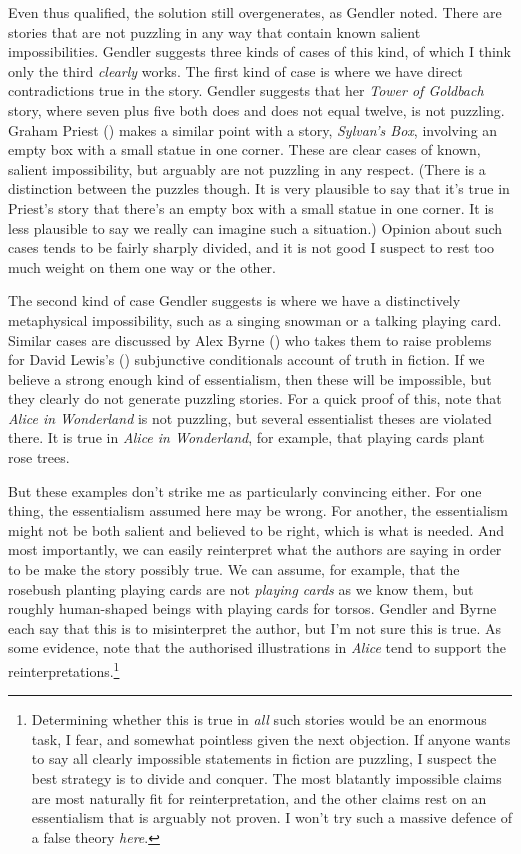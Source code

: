 \documentclass[
  11pt,
  letterpaper,
  DIV=11,
  numbers=noendperiod,
  twoside]{scrartcl}
\begin{document}
Even thus qualified, the solution still overgenerates, as Gendler noted.
There are stories that are not puzzling in any way that contain known
salient impossibilities. Gendler suggests three kinds of cases of this
kind, of which I think only the third \emph{clearly} works. The first
kind of case is where we have direct contradictions true in the story.
Gendler suggests that her \emph{Tower of Goldbach} story, where seven
plus five both does and does not equal twelve, is not puzzling. Graham
Priest () makes a similar point with a
story, \emph{Sylvan's Box}, involving an empty box with a small statue
in one corner. These are clear cases of known, salient impossibility,
but arguably are not puzzling in any respect. (There is a distinction
between the puzzles though. It is very plausible to say that it's true
in Priest's story that there's an empty box with a small statue in one
corner. It is less plausible to say we really can imagine such a
situation.) Opinion about such cases tends to be fairly sharply divided,
and it is not good I suspect to rest too much weight on them one way or
the other.

The second kind of case Gendler suggests is where we have a
distinctively metaphysical impossibility, such as a singing snowman or a
talking playing card. Similar cases are discussed by Alex Byrne
() who takes them to raise problems for
David Lewis's () subjunctive conditionals
account of truth in fiction. If we believe a strong enough kind of
essentialism, then these will be impossible, but they clearly do not
generate puzzling stories. For a quick proof of this, note that
\emph{Alice in Wonderland} is not puzzling, but several essentialist
theses are violated there. It is true in \emph{Alice in Wonderland}, for
example, that playing cards plant rose trees.

But these examples don't strike me as particularly convincing either.
For one thing, the essentialism assumed here may be wrong. For another,
the essentialism might not be both salient and believed to be right,
which is what is needed. And most importantly, we can easily reinterpret
what the authors are saying in order to be make the story possibly true.
We can assume, for example, that the rosebush planting playing cards are
not \emph{playing cards} as we know them, but roughly human-shaped
beings with playing cards for torsos. Gendler and Byrne each say that
this is to misinterpret the author, but I'm not sure this is true. As
some evidence, note that the authorised illustrations in \emph{Alice}
tend to support the reinterpretations.\footnote{Determining whether this
  is true in \emph{all} such stories would be an enormous task, I fear,
  and somewhat pointless given the next objection. If anyone wants to
  say all clearly impossible statements in fiction are puzzling, I
  suspect the best strategy is to divide and conquer. The most blatantly
  impossible claims are most naturally fit for reinterpretation, and the
  other claims rest on an essentialism that is arguably not proven. I
  won't try such a massive defence of a false theory \emph{here}.}
\end{document}
